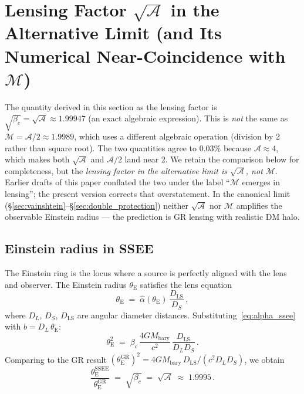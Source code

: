 \documentclass[12pt,a4paper]{article}
\newcommand{\MIRA}{\mathcal{M}}
\newcommand{\AURA}{\mathcal{A}}
\newcommand{\bc}{\beta_c}
\newcommand{\thetaE}{\theta_{\mathrm{E}}}
\newcommand{\hatalf}{\hat{\alpha}}
\begin{document}
\section{Lensing Factor \texorpdfstring{$\sqrt{\AURA}$}{sqrt(AURA)} in the Alternative Limit
         (and Its Numerical Near-Coincidence with \texorpdfstring{$\MIRA$}{M})}
\label{sec:mira}

\begin{tcolorbox}[colback=yellow!8,colframe=orange!60,title=Naming clarification]
The quantity derived in this section as the lensing factor is
$\sqrt{\bc}=\sqrt{\AURA}\approx 1.99947$ (an exact algebraic expression).
This is \emph{not} the same as $\MIRA=\AURA/2\approx 1.9989$, which uses a
different algebraic operation (division by 2 rather than square root). The
two quantities agree to $0.03\%$ because $\AURA\approx 4$, which makes both
$\sqrt{\AURA}$ and $\AURA/2$ land near $2$. We retain the comparison below
for completeness, but the \emph{lensing factor in the alternative limit is
$\sqrt{\AURA}$, not $\MIRA$}. Earlier drafts of this paper conflated the two
under the label ``$\MIRA$ emerges in lensing''; the present version corrects
that overstatement. In the canonical limit
(\S\ref{sec:vainshtein}--\S\ref{sec:double_protection}) neither $\sqrt{\AURA}$
nor $\MIRA$ amplifies the observable Einstein radius — the prediction is GR
lensing with realistic DM halo.
\end{tcolorbox}

\subsection{Einstein radius in SSEE}

The Einstein ring is the locus where a source is perfectly aligned with the
lens and observer.
The Einstein radius $\thetaE$ satisfies the lens equation
\begin{equation}
  \thetaE \;=\; \hatalf(\thetaE)\,\frac{D_{\mathrm{LS}}}{D_S}\,,
  \label{eq:lens_eq}
\end{equation}
where $D_L$, $D_S$, $D_{\mathrm{LS}}$ are angular diameter distances.
Substituting~\eqref{eq:alpha_ssee} with $b = D_L\,\thetaE$:
\begin{equation}
  \thetaE^2 \;=\; \bc\,\frac{4G M_{\mathrm{bary}}}{c^2}\,
                  \frac{D_{\mathrm{LS}}}{D_L D_S}\,.
  \label{eq:thetaE_ssee}
\end{equation}
Comparing to the GR result $(\thetaE^{\mathrm{GR}})^2 = 4GM_{\mathrm{bary}}\,
D_{\mathrm{LS}}/(c^2 D_L D_S)$, we obtain
\begin{equation}
  \boxed{\frac{\thetaE^{\mathrm{SSEE}}}{\thetaE^{\mathrm{GR}}}
         \;=\; \sqrt{\bc}
         \;=\; \sqrt{\AURA}
         \;\approx\; 1.9995\,.}
  \label{eq:thetaE_ratio}
\end{equation}
\end{document}
